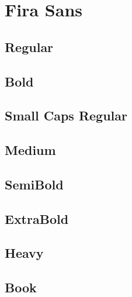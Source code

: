 \documentclass{article}
\begin{document}
\section*{Fira Sans}

\subsection*{Regular}
\lipsum[1]

\textit{\lipsum[2]}

\subsection*{Bold}

\textbf{\lipsum[3]}

\textbf{\textit{\lipsum[4]}}


\subsection*{Small Caps Regular}

\textsc{\lipsum[5]}

\textsc{\textit{\lipsum[6]}}

\subsection*{Medium}
{\firamedium \lipsum[8]}

{\firamedium \textit{\lipsum[10]}}


\subsection*{SemiBold}
{\firasemibold \lipsum[8]}

{\firasemibold \textit{\lipsum[10]}}

\subsection*{ExtraBold}
{\firaextrabold \lipsum[8]}

{\firaextrabold \textit{\lipsum[10]}}


\subsection*{Heavy}
{\firaheavy \lipsum[8]}

{\firaheavy \textit{\lipsum[10]}}


\subsection*{Book}
{\firabook \lipsum[9]}
\end{document}
